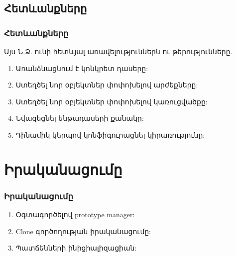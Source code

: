 \documentclass{beamer}
\begin{document}
\subsection{Հետևանքները}
\begin{frame}\frametitle{Հետևանքները}
Այս Ն.Ձ. ունի հետևյալ առավելություններն ու թերությունները.
\vfill
\begin{enumerate}
    \item Առանձնացնում է կոնկրետ դասերը: \pause \vfill
    \item Ստեղծել նոր օբյեկտներ փոփոխելով արժեքները: \pause \vfill
    \item Ստեղծել նոր օբյեկտներ փոփոխելով կառուցվածքը: \pause \vfill
    \item Նվազեցնել ենթադասերի քանակը: \pause \vfill
    \item Դինամիկ կերպով կոնֆիգուրացնել կիրառությունը:
\end{enumerate}
\end{frame}

\section{Իրականացումը}
\begin{frame}\frametitle{Իրականացումը}
\begin{enumerate}
    \item Օգտագործելով prototype manager: \pause \vfill
    \item Clone գործողության իրականացումը: \pause \vfill
    \item Պատճենների ինիցիալիզացիան:
\end{enumerate}
\end{frame}
\end{document}
